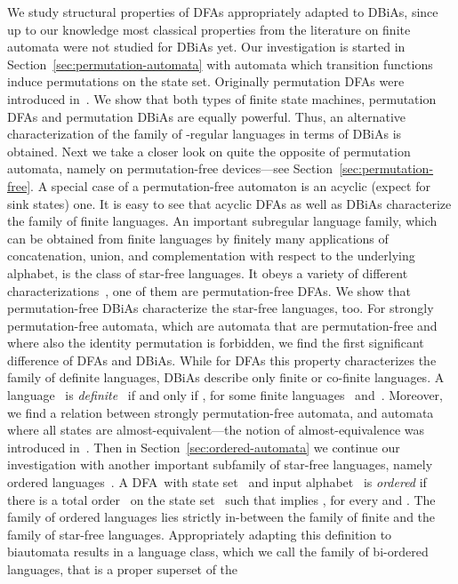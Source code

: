 \documentclass[submission]{eptcs}
\newcommand{\dfa}{\textrm{DFA}}
\newcommand{\dbia}{\textrm{DBiA}}
\begin{document}
We study structural properties of \dfa s appropriately adapted to
\dbia s, since up to our knowledge most classical properties from the
literature on finite automata were not studied for \dbia s yet.  Our
investigation is started in Section~\ref{sec:permutation-automata}
with automata which transition functions induce permutations on the
state set. Originally permutation \dfa s were introduced
in~\cite{Th68a}. We show that both types of finite state machines,
permutation \dfa s and permutation \dbia s are equally powerful. Thus,
an alternative characterization of the family of -regular languages
in terms of \dbia s is obtained. Next we take a closer look on quite
the opposite of permutation automata, namely on permutation-free
devices---see Section~\ref{sec:permutation-free}.  A special case of a
permutation-free automaton is an acyclic (expect for sink states)
one. It is easy to see that acyclic \dfa s as well as \dbia s
characterize the family of finite languages.
An important subregular language family, which can be obtained from
finite languages by finitely many applications of concatenation,
union, and complementation with respect to the underlying alphabet, is
the class of star-free languages.  It obeys a variety of different
characterizations~\cite{McNaPa71}, one of them are permutation-free
\dfa s. We show that permutation-free \dbia s characterize the
star-free languages, too. For strongly permutation-free automata,
which are automata that are permutation-free and where also the
identity permutation is forbidden, we find the first significant
difference of \dfa s and \dbia s. While for \dfa s this property
characterizes the family of definite languages, \dbia s describe only
finite or co-finite languages. A language~ is
\emph{definite}~\cite{PRS63} if and only if ,
for some finite languages~ and~.  Moreover, we find a
relation between strongly permutation-free automata, and automata
where all states are almost-equivalent---the notion of
almost-equivalence was introduced in~\cite{BGS09}.  Then in
Section~\ref{sec:ordered-automata} we continue our investigation with
another important subfamily of star-free languages, namely ordered
languages~\cite{ShTh74}. A \dfa\ with state set~ and input
alphabet~ is \emph{ordered} if there is a total order~
on the state set~ such that  implies , for every  and . The family of
ordered languages lies strictly in-between the family of finite and
the family of star-free languages. Appropriately adapting this
definition to biautomata results in a language class, which we call
the family of bi-ordered languages, that is a proper superset of the
\end{document}
